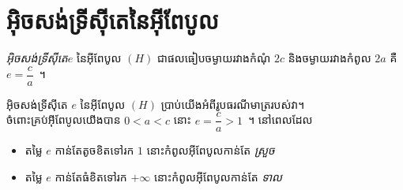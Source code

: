 \section{អ៊ិចសង់ទ្រីស៊ីតេនៃអ៊ីពែបូល}
%
\begin{definition*}
	\emph{អ៊ិចសង់ទ្រីស៊ីតេ}​ $ e $ នៃអ៊ីពែបូល $ (H) $ ជាផលធៀបចម្ងាយរវាងកំណុំ $ 2c $ និងចម្ងាយរវាងកំពូល $ 2a $ គឺ $ e=\dfrac{c}{a} $~។
\end{definition*}
%
\noindent អ៊ិចសង់ទ្រីស៊ីតេ $ e $ នៃអ៊ីពែបូល $ (H) $ ប្រាប់យើងអំពីរូបធរណីមាត្ររបស់វា។\\ ចំពោះគ្រប់អ៊ីពែបូលយើងបាន $ 0<a<c $ នោះ $ e=\dfrac{c}{a}>1 $~។ នៅពេលដែល
%
\begin{itemize}
	\item តម្លៃ $ e $ កាន់តែតូចខិតទៅរក $ 1 $ នោះកំពូលអ៊ីពែបូលកាន់តែ​ \emph{ស្រួច}
	\item តម្លៃ $ e $ កាន់តែធំខិតទៅរក $ +\infty $ នោះកំពូលអ៊ីពែបូលកាន់តែ​ \emph{ទាល}
\end{itemize}
%
